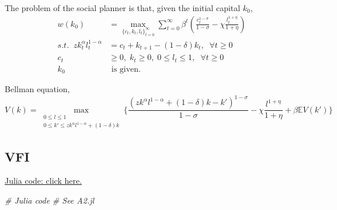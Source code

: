 \documentclass[]{article}
\newenvironment{Shaded}{\begin{snugshade}}{\end{snugshade}}
\newcommand{\CommentTok}[1]{\textcolor[rgb]{0.56,0.35,0.01}{\textit{#1}}}
\begin{document}
The problem of the social planner is that, given the initial capital
\(k_0\), \begin{equation}\label{SPP1}
                \begin{split}
                    w( k_0)&=\max_{\{c_t, k_t, l_t \}_{t=0}^{\infty}}
                    \sum_{t=0}^{\infty}
                    \beta ^t(\frac{c_t^{1-\sigma}}{1-\sigma}-\chi \frac{l_t^{1+\eta}}{1+\eta})\\
                    s.t. \;\;zk_t^{\alpha}l_t^{1-\alpha}&=c_t+k_{t+1}-(1-\delta)k_t, \;\;\forall t\geq 0\\
                    c_t&\geq0,\;k_t\geq0,\;0\leq l_t\leq 1,  \;\;\forall t\geq 0\\
                    k_0&\text{ is given.}
                \end{split}
            \end{equation}

Bellman equation, \begin{equation}
                V(k)=\max_{\begin{smallmatrix}0\leq l\leq 1
                    \\0\leq k'\leq zk^{\alpha}l^{1-\alpha}+(1-\delta)k\end{smallmatrix}}
                    \{\frac{(zk^{\alpha}l^{1-\alpha}+(1-\delta)k-k')^{1-\sigma}}{1-\sigma}-\chi \frac{l^{1+\eta}}{1+\eta}+\beta \mathbb{E}V(k')\}
            \end{equation}

\hypertarget{vfi}{%
\subsection{VFI}\label{vfi}}

\href{https://github.com/hans-mtz/AdvMacro/blob/master/A2.jl}{Julia
code: click here.}

\begin{Shaded}
\begin{Highlighting}[]
\CommentTok{# Julia code}
\CommentTok{# See A2.jl}
\end{Highlighting}
\end{Shaded}
\end{document}
